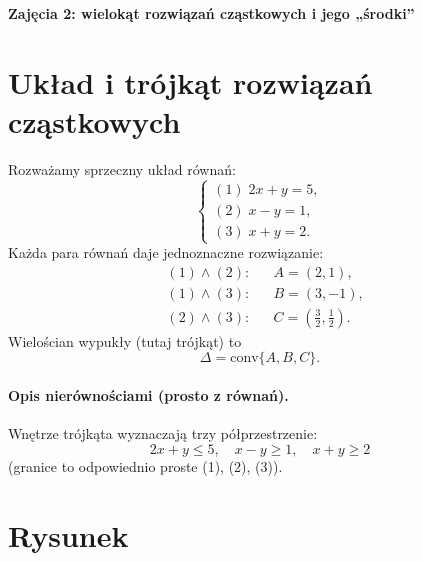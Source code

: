 \documentclass[12pt,a4paper]{article}
\begin{document}
\begin{center}
\Large \textbf{Zajęcia 2: wielokąt rozwiązań cząstkowych i jego „środki”}
\end{center}

\section*{Układ i trójkąt rozwiązań cząstkowych}

Rozważamy sprzeczny układ równań:
\[
\begin{cases}
(1)\; 2x + y = 5,\\
(2)\; x - y = 1,\\
(3)\; x + y = 2.
\end{cases}
\]
Każda para równań daje jednoznaczne rozwiązanie:
\[
\begin{aligned}
&(1)\wedge(2): && A=(2,1),\\
&(1)\wedge(3): && B=(3,-1),\\
&(2)\wedge(3): && C=\left(\tfrac{3}{2},\tfrac{1}{2}\right).
\end{aligned}
\]
Wielościan wypukły (tutaj trójkąt) to
\[
\Delta=\mathrm{conv}\{A,B,C\}.
\]

\paragraph{Opis nierównościami (prosto z równań).}
Wnętrze trójkąta wyznaczają trzy półprzestrzenie:
\[
\boxed{\;2x+y\le 5,\quad x-y\ge 1,\quad x+y\ge 2\;}
\]
(granice to odpowiednio proste (1), (2), (3)).

\section*{Rysunek}
\end{document}
